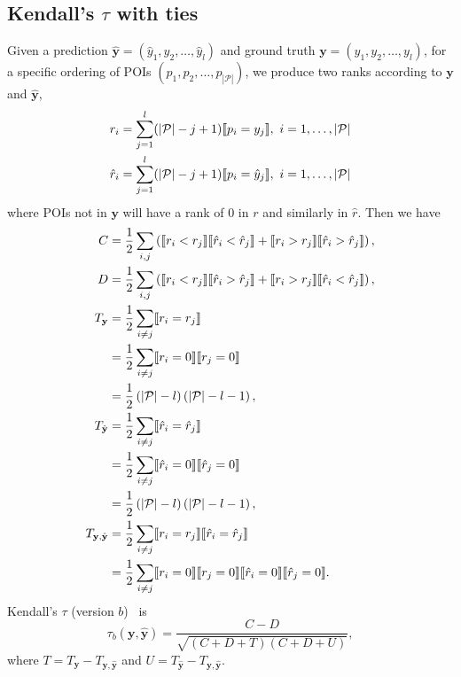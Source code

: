 \subsection{Kendall's $\tau$ with ties}

Given a prediction $\hat{\mathbf{y}} = (\hat{y}_1, \hat{y}_2, \dots, \hat{y}_l)$ and ground truth $\mathbf{y} = (y_1, y_2, \dots, y_l)$,
for a specific ordering of POIs $(p_1, p_2, \dots, p_{|\mathcal{P}|})$,
we produce two ranks according to $\mathbf{y}$ and $\hat{\mathbf{y}}$,
\begin{align*}
r_i       &= \sum_{j=1}^l (| \mathcal{P} | - j + 1)  \llbracket p_i = y_j \rrbracket,~
i = 1, \dots, | \mathcal{P} | \\
\hat{r}_i &= \sum_{j=1}^l (| \mathcal{P} | - j + 1)  \llbracket p_i = \hat{y}_j \rrbracket,~
i = 1, \dots, | \mathcal{P} |
\end{align*}
where POIs not in $\mathbf{y}$ will have a rank of $0$ in $r$ and similarly in $\hat{r}$.
Then we have
\begin{align*}
C &= \frac{1}{2} \sum_{i,j} \left(\llbracket r_i < r_j \rrbracket  \llbracket \hat{r}_i < \hat{r}_j \rrbracket +
     \llbracket r_i > r_j \rrbracket  \llbracket \hat{r}_i > \hat{r}_j \rrbracket \right), \\
D &= \frac{1}{2} \sum_{i,j} \left(\llbracket r_i < r_j \rrbracket  \llbracket \hat{r}_i > \hat{r}_j \rrbracket +
     \llbracket r_i > r_j \rrbracket  \llbracket \hat{r}_i < \hat{r}_j \rrbracket \right), \\
T_{\mathbf{y}} &= \frac{1}{2} \sum_{i \ne j} \llbracket r_i = r_j \rrbracket \\
               &= \frac{1}{2} \sum_{i \ne j} \llbracket r_i = 0 \rrbracket  \llbracket r_j = 0 \rrbracket \\
               &= \frac{1}{2} \left( |\mathcal{P}| - l \right) \left( |\mathcal{P}| - l - 1 \right), \\
T_{\hat{\mathbf{y}}} &= \frac{1}{2} \sum_{i \ne j} \llbracket \hat{r}_i = \hat{r}_j \rrbracket \\
                     &= \frac{1}{2} \sum_{i \ne j} \llbracket \hat{r}_i = 0 \rrbracket  \llbracket \hat{r}_j = 0 \rrbracket \\
                     &= \frac{1}{2} \left( |\mathcal{P}| - l \right) \left( |\mathcal{P}| - l - 1 \right), \\
T_{\mathbf{y},\hat{\mathbf{y}}} &= \frac{1}{2} \sum_{i \ne j} \llbracket r_i = r_j \rrbracket  \llbracket \hat{r}_i = \hat{r}_j \rrbracket \\
                                &= \frac{1}{2} \sum_{i \ne j} \llbracket r_i = 0 \rrbracket  \llbracket r_j = 0 \rrbracket
                                   \llbracket \hat{r}_i = 0 \rrbracket  \llbracket \hat{r}_j = 0 \rrbracket.
\end{align*}
Kendall's $\tau$ (version $b$)~\cite{kendall1945,agresti2010analysis} is
\begin{equation*}
\tau_b(\mathbf{y}, \hat{\mathbf{y}}) = \frac{C - D}{\sqrt{(C + D + T) (C + D + U)}},
\end{equation*}
where $T = T_{\mathbf{y}} - T_{\mathbf{y},\hat{\mathbf{y}}}$ and $U = T_{\hat{\mathbf{y}}} - T_{\mathbf{y},\hat{\mathbf{y}}}$.

